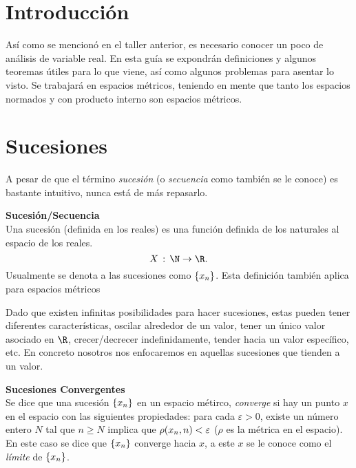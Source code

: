 \section*{Introducción}
Así como se mencionó en el taller anterior, es necesario conocer un poco de análisis de variable real. En esta guía se expondrán definiciones y algunos teoremas útiles para lo que viene, así como algunos problemas para asentar lo visto. Se trabajará en espacios métricos, teniendo en mente que tanto los espacios normados y con producto interno son espacios métricos.

\section*{Sucesiones}

A pesar de que el término \textit{sucesión} (o \textit{secuencia} como también se le conoce) es bastante intuitivo, nunca está de más repasarlo.


\begin{mdframed}[style=warning]
	{\large \textbf{Sucesión/Secuencia}} \\
	Una sucesión (definida en los reales) es una función definida de los naturales al espacio de los reales.
		$$ X\, :\, \N \to \R . $$
	Usualmente se denota a las sucesiones como $\{ x_{n} \}$. Esta definición también aplica para espacios métricos
\end{mdframed}

Dado que existen infinitas posibilidades para hacer sucesiones, estas pueden tener diferentes características, oscilar alrededor de un valor, tener un único valor asociado en $\R$, crecer/decrecer indefinidamente, tender hacia un valor específico, etc. En concreto nosotros nos enfocaremos en aquellas sucesiones que tienden a un valor.


\begin{mdframed}[style=warning]
	{\large \textbf{Sucesiones Convergentes}} \\
	Se dice que una sucesión $\{ x_{n} \}$ en un espacio métirco, \textit{converge} si hay un punto $x$ en el espacio con las siguientes propiedades: para cada $\varepsilon > 0$, existe un número entero $N$ tal que $n\geq N$ implica que $\rho(x_n,n) < \varepsilon$ ($\rho$ es la métrica en el espacio). En este caso se dice que $\{ x_{n} \}$ converge hacia $x$, a este $x$ se le conoce como el \textit{límite} de $\{ x_{n} \}$.
	
\end{mdframed}



